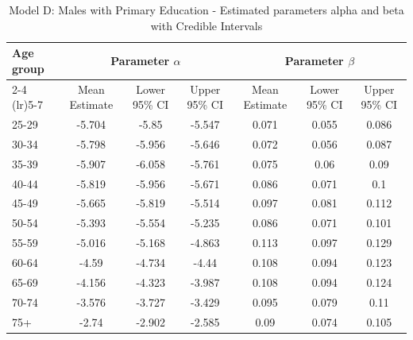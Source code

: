 \begin{landscape}
\begin{table}[htbp]
\centering
\caption{Model D: Males with Primary Education - Estimated parameters alpha and beta  with Credible Intervals}
\label{tab:parameters_ab30}
\begin{tabular}{@{}lcccccc@{}}
\toprule
Age group & \multicolumn{3}{c}{Parameter \(\alpha\)} & \multicolumn{3}{c}{Parameter \(\beta\)} \\ 
\cmidrule(lr){2-4} \cmidrule(lr){5-7}
          & Mean Estimate & Lower 95\% CI & Upper 95\% CI & Mean Estimate & Lower 95\% CI & Upper 95\% CI \\ 
\midrule
25-29 & -5.704 & -5.85 & -5.547 & 0.071 & 0.055 & 0.086 \\
30-34 & -5.798 & -5.956 & -5.646 & 0.072 & 0.056 & 0.087 \\
35-39 & -5.907 & -6.058 & -5.761 & 0.075 & 0.06 & 0.09 \\
40-44 & -5.819 & -5.956 & -5.671 & 0.086 & 0.071 & 0.1 \\
45-49 & -5.665 & -5.819 & -5.514 & 0.097 & 0.081 & 0.112 \\
50-54 & -5.393 & -5.554 & -5.235 & 0.086 & 0.071 & 0.101 \\
55-59 & -5.016 & -5.168 & -4.863 & 0.113 & 0.097 & 0.129 \\
60-64 & -4.59 & -4.734 & -4.44 & 0.108 & 0.094 & 0.123 \\
65-69 & -4.156 & -4.323 & -3.987 & 0.108 & 0.094 & 0.124 \\
70-74 & -3.576 & -3.727 & -3.429 & 0.095 & 0.079 & 0.11 \\
75+ & -2.74 & -2.902 & -2.585 & 0.09 & 0.074 & 0.105 \\
\bottomrule
\end{tabular}
\end{table}
\end{landscape}